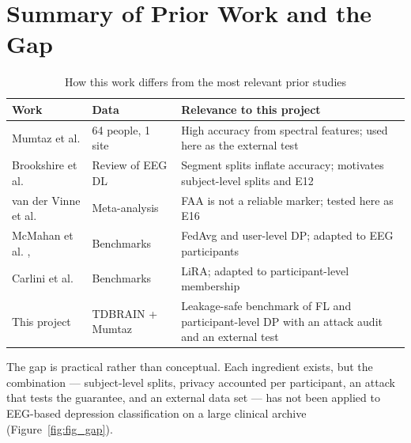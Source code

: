 \documentclass[12pt,a4paper,oneside]{report}
\begin{document}
\section{Summary of Prior Work and the Gap}
\begin{table}[!htbp]\centering\small{}
\caption{How this work differs from the most relevant prior studies}\label{tab:related}
\begin{tabularx}{\textwidth}{llX}
\toprule
Work & Data & Relevance to this project\\
\midrule
Mumtaz et al. \cite{mumtaz17} & 64 people, 1 site & High accuracy from spectral features; used here as the external test\\
Brookshire et al. \cite{leak} & Review of EEG DL & Segment splits inflate accuracy; motivates subject-level splits and E12\\
van der Vinne et al. \cite{faa} & Meta-analysis & FAA is not a reliable marker; tested here as E16\\
McMahan et al. \cite{fedavg}, \cite{userdp} & Benchmarks & FedAvg and user-level DP; adapted to EEG participants\\
Carlini et al. \cite{lira} & Benchmarks & LiRA; adapted to participant-level membership\\
This project & TDBRAIN + Mumtaz & Leakage-safe benchmark of FL and participant-level DP with an attack audit and an external test\\
\bottomrule
\end{tabularx}
\end{table}
The gap is practical rather than conceptual. Each ingredient exists, but the combination --- subject-level splits, privacy accounted per participant, an attack that tests the guarantee, and an external data set --- has not been applied to EEG-based depression classification on a large clinical archive (Figure~\ref{fig:fig_gap}).
\end{document}
